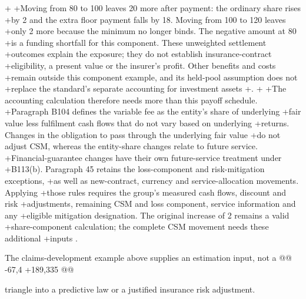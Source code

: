 +
+Moving from 80 to 100 leaves 20 more after payment: the ordinary share rises
+by 2 and the extra floor payment falls by 18. Moving from 100 to 120 leaves
+only 2 more because the minimum no longer binds. The negative amount at 80
+is a funding shortfall for this component. These unweighted settlement
+outcomes explain the exposure; they do not establish insurance-contract
+eligibility, a present value or the insurer's profit. Other benefits and costs
+remain outside this component example, and its held-pool assumption does not
+replace the standard's separate accounting for investment assets
+\citep[paragraphs B66(a), B107--B108]{aasb17}.
+
+The accounting calculation therefore needs more than this payoff schedule.
+Paragraph B104 defines the variable fee as the entity's share of underlying
+fair value less fulfilment cash flows that do not vary based on underlying
+returns. Changes in the obligation to pass through the underlying fair value
+do not adjust CSM, whereas the entity-share changes relate to future service.
+Financial-guarantee changes have their own future-service treatment under
+B113(b). Paragraph 45 retains the loss-component and risk-mitigation exceptions,
+as well as new-contract, currency and service-allocation movements. Applying
+those rules requires the group's measured cash flows, discount and risk
+adjustments, remaining CSM and loss component, service information and any
+eligible mitigation designation. The original increase of 2 remains a valid
+share-component calculation; the complete CSM movement needs these additional
+inputs \citep[paragraphs 32--38, 45, 48--50 and B104--B118]{aasb17}.
 
 The claims-development example above supplies an estimation input, not a
@@ -67,4 +189,335 @@

 triangle into a predictive law or a justified insurance risk adjustment.
 
